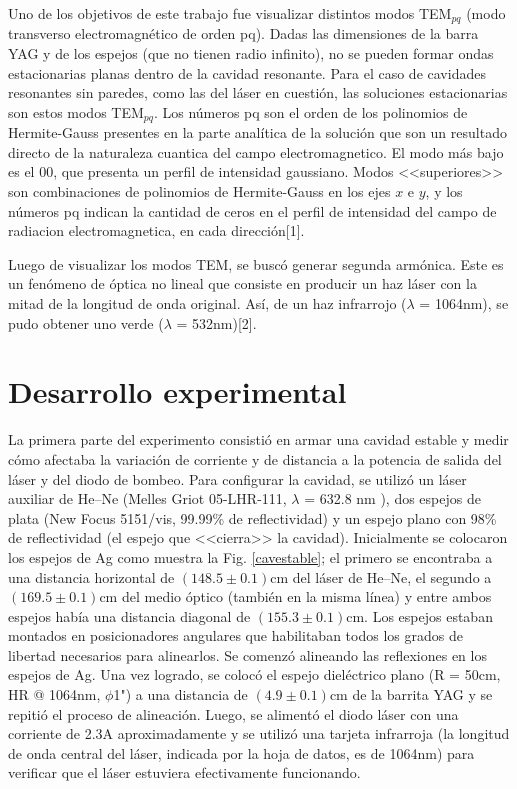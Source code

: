 \documentclass[10pt, a4paper]{article}%
\begin{document}
\begin{multicols}{2}
Uno de los objetivos de este trabajo fue visualizar distintos modos TEM$_{pq}$ (modo transverso electromagnético de orden pq). Dadas las dimensiones de la barra YAG y de los espejos (que no tienen radio infinito), no se pueden formar ondas estacionarias planas dentro de la cavidad resonante. Para el caso de cavidades resonantes sin paredes, como las del láser en cuestión, las soluciones estacionarias son estos modos TEM$_{pq}$. Los números pq son el orden de los polinomios de Hermite-Gauss presentes en la parte analítica de la solución  que son un resultado directo de la naturaleza cuantica del campo electromagnetico. El modo más bajo es el 00, que presenta un perfil de intensidad gaussiano. Modos <<superiores>> son combinaciones de polinomios de Hermite-Gauss en los ejes $x$ e $y$, y los números pq indican la cantidad de ceros en el perfil de intensidad del campo de radiacion electromagnetica, en cada dirección[1].

Luego de visualizar los modos TEM, se buscó generar segunda armónica. Este es un fenómeno de óptica no lineal que consiste en producir un haz láser con la mitad de la longitud de onda original. Así, de un haz infrarrojo ($\lambda$ = 1064nm), se pudo obtener uno verde ($\lambda$ = 532nm)[2].


\section{Desarrollo experimental}
La primera parte del experimento consistió en armar una cavidad estable y medir cómo afectaba la variación de corriente y de distancia a la potencia de salida del láser y del diodo de bombeo. Para configurar la cavidad, se utilizó un láser auxiliar de He--Ne (Melles Griot 05-LHR-111, $\lambda$ = 632.8 nm ), dos espejos de plata (New Focus 5151/vis, 99.99\% de reflectividad) y un espejo plano con 98\% de reflectividad (el espejo que <<cierra>> la cavidad). Inicialmente se colocaron los espejos de Ag como muestra la Fig. \ref{cavestable}; el primero se encontraba a una distancia horizontal de $(148.5 \pm 0.1)$cm del láser de He--Ne, el segundo a $(169.5 \pm 0.1)$cm del medio óptico (también en la misma línea) y entre ambos espejos había una distancia diagonal de $(155.3 \pm 0.1)$cm. Los espejos estaban montados en posicionadores angulares que habilitaban todos los grados de libertad necesarios para alinearlos. Se comenzó alineando las reflexiones en los espejos de Ag. Una vez logrado, se colocó el espejo dieléctrico plano (R = 50cm, HR @ 1064nm, $\phi$1") a una distancia de $(4.9 \pm 0.1)$cm de la barrita YAG y se repitió el proceso de alineación. Luego, se alimentó el diodo láser con una corriente de 2.3A aproximadamente y se utilizó una tarjeta infrarroja (la longitud de onda central del láser, indicada por la hoja de datos, es de 1064nm) para verificar que el láser estuviera efectivamente funcionando. 


\end{multicols}
\end{document}
